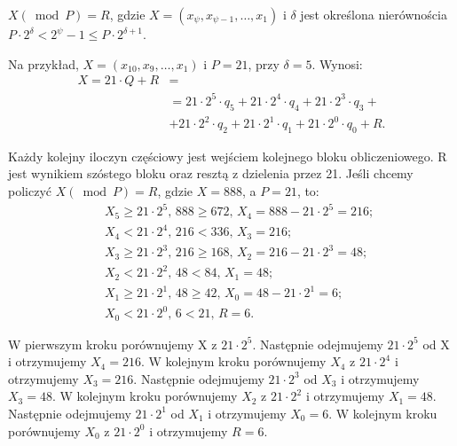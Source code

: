 \documentclass[11pt]{article}
\renewcommand\*{\cdot}
\begin{document}
$X(\bmod P)=R$, gdzie $X=\left(x_\psi, x_{\psi-1}, \ldots, x_1\right)$ i $\delta$ jest określona nierównościa $P \cdot 2^{\delta}<2^\psi-1 \leq P \cdot 2^{\delta+1}$.

Na przykład, $X=\left(x_{10}, x_9, \ldots, x_1\right)$ i $P=21$, przy  $\delta=5$. Wynosi:
$$
    \begin{aligned}
        X=21 \cdot Q+R & =                                                                         \\
                       & =21 \cdot 2^5 \cdot q_5+21 \cdot 2^4 \cdot q_4+21 \cdot 2^3 \cdot q_3+    \\
                       & +21 \cdot 2^2 \cdot q_2+21 \cdot 2^1 \cdot q_1+21 \cdot 2^0 \cdot q_0+R .
    \end{aligned}
$$

Każdy kolejny iloczyn częściowy jest wejściem kolejnego bloku obliczeniowego. R jest wynikiem szóstego bloku oraz resztą z dzielenia przez 21.
Jeśli chcemy policzyć $X(\bmod P)=R$, gdzie $X = 888$, a $P = 21$, to:
$$
    \begin{aligned}
         & \text { } X_5 \geq 21 \cdot 2^5 \text {, } 888 \geq 672 \text {,  } X_4=888-21 \cdot 2^5=216 \text {; } \\
         & \text { } X_4<21 \cdot 2^4 \text {,  } 216<336 \text {,  } X_3=216 ;                                    \\
         & \text { } X_3 \geq 21 \cdot 2^3 \text {,  } 216 \geq 168 \text {,  } X_2=216-21 \cdot 2^3=48 \text {; } \\
         & \text {  } X_2<21 \cdot 2^2 \text {,  } 48<84 \text {,  } X_1=48 ;                                      \\
         & \text {  } X_1 \geq 21 \cdot 2^1 \text {,  } 48 \geq 42 \text {,  } X_0=48-21 \cdot 2^1=6 \text {; }    \\
         & \text { } X_0<21 \cdot 2^0 \text {, } 6<21 \text {,  } R=6 \text {. }
    \end{aligned}
$$

W pierwszym kroku porównujemy X z $21 \cdot 2^5$.
Następnie odejmujemy $21 \cdot 2^5$ od X i otrzymujemy $X_4=216$.
W kolejnym kroku porównujemy $X_4$ z $21 \cdot 2^4$ i otrzymujemy $X_3=216$.
Następnie odejmujemy $21 \cdot 2^3$ od $X_3$ i otrzymujemy $X_3=48$.
W kolejnym kroku porównujemy $X_2$ z $21 \cdot 2^2$ i otrzymujemy $X_1=48$.
Następnie odejmujemy $21 \cdot 2^1$ od $X_1$ i otrzymujemy $X_0=6$.
W kolejnym kroku porównujemy $X_0$ z $21 \cdot 2^0$ i otrzymujemy $R=6$.
\end{document}
